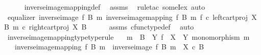 \begin{isabellebody}
\ \ \ \ \isamarkupfalse%
\ inverse{\isacharunderscore}{\kern0pt}image{\isacharunderscore}{\kern0pt}mapping{\isacharunderscore}{\kern0pt}def\ \isamarkupfalse%
\ assms\ \isamarkupfalse%
\ {\isacharparenleft}{\kern0pt}rule{\isacharunderscore}{\kern0pt}tac\ someI{\isacharunderscore}{\kern0pt}ex{\isacharcomma}{\kern0pt}\ auto{\isacharparenright}{\kern0pt}\isanewline
\ \ \isamarkupfalse%
\ \isamarkupfalse%
\ {\isachardoublequoteopen}equalizer\ {\isacharparenleft}{\kern0pt}inverse{\isacharunderscore}{\kern0pt}image\ f\ B\ m{\isacharparenright}{\kern0pt}\ {\isacharparenleft}{\kern0pt}inverse{\isacharunderscore}{\kern0pt}image{\isacharunderscore}{\kern0pt}mapping\ f\ B\ m{\isacharparenright}{\kern0pt}\ {\isacharparenleft}{\kern0pt}f\ {\isasymcirc}\isactrlsub c\ left{\isacharunderscore}{\kern0pt}cart{\isacharunderscore}{\kern0pt}proj\ X\ B{\isacharparenright}{\kern0pt}\ {\isacharparenleft}{\kern0pt}m\ {\isasymcirc}\isactrlsub c\ right{\isacharunderscore}{\kern0pt}cart{\isacharunderscore}{\kern0pt}proj\ X\ B{\isacharparenright}{\kern0pt}{\isachardoublequoteclose}\isanewline
\ \ \ \ \isamarkupfalse%
\ assms{\isacharparenleft}{\kern0pt}{}{\isacharparenright}{\kern0pt}\ cfunc{\isacharunderscore}{\kern0pt}type{\isacharunderscore}{\kern0pt}def\ \isamarkupfalse%
\ auto\isanewline
{}\isamarkupfalse%
%
\endisatagproof
{\isafoldproof}%
%
\isadelimproof
\isanewline
%
\endisadelimproof
\isanewline
{}\isamarkupfalse%
\ inverse{\isacharunderscore}{\kern0pt}image{\isacharunderscore}{\kern0pt}mapping{\isacharunderscore}{\kern0pt}type{\isacharbrackleft}{\kern0pt}type{\isacharunderscore}{\kern0pt}rule{\isacharbrackright}{\kern0pt}{\isacharcolon}{\kern0pt}\isanewline
\ \ \ {\isachardoublequoteopen}m\ {\isacharcolon}{\kern0pt}\ B\ {\isasymrightarrow}\ Y{\isachardoublequoteclose}\ {\isachardoublequoteopen}f\ {\isacharcolon}{\kern0pt}\ X\ {\isasymrightarrow}\ Y{\isachardoublequoteclose}\ {\isachardoublequoteopen}monomorphism\ m{\isachardoublequoteclose}\isanewline
\ \ \ {\isachardoublequoteopen}inverse{\isacharunderscore}{\kern0pt}image{\isacharunderscore}{\kern0pt}mapping\ f\ B\ m\ {\isacharcolon}{\kern0pt}\ {\isacharparenleft}{\kern0pt}inverse{\isacharunderscore}{\kern0pt}image\ f\ B\ m{\isacharparenright}{\kern0pt}\ {\isasymrightarrow}\ X\ {\isasymtimes}\isactrlsub c\ B{\isachardoublequoteclose}\isanewline
%
\isadelimproof
\ \ %
\endisadelimproof
%
\isatagproof
{}\isamarkupfalse%

\end{isabellebody}
